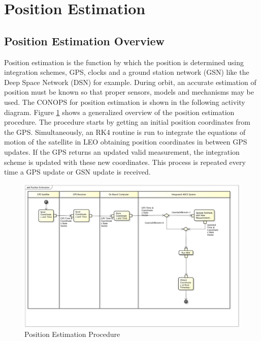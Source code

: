 \documentclass[conf]{new-aiaa}
\begin{document}
\section{Position Estimation}
\subsection{Position Estimation Overview}
Position estimation is the function by which the position is determined using integration schemes, GPS, clocks and a ground station network (GSN) like the Deep Space Network (DSN) for example. During orbit, an accurate estimation of position must be known so that proper sensors, models and mechanisms may be used. The CONOPS for position estimation is shown in the following activity diagram. Figure \ref{fig:PE_AD_2} shows a generalized overview of the position estimation procedure. The procedure starts by getting an initial position coordinates from the GPS. Simultaneously, an RK4 routine is run to integrate the equations of motion of the satellite in LEO obtaining position coordinates in between GPS updates. If the GPS returns an updated valid measurement, the integration scheme is updated with these new coordinates. This process is repeated every time a GPS update or GSN update is received.

\begin{figure}[H]
\centering
\includegraphics[width=1.0\textwidth]{Figures/PE_AD_2.png}
\caption{Position Estimation Procedure}
\label{fig:PE_AD_2}
\end{figure}
\end{document}
